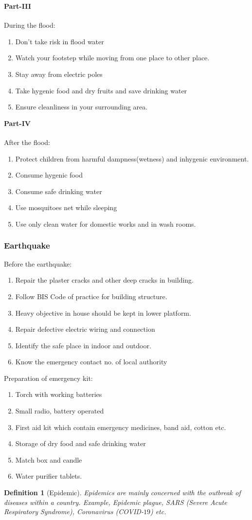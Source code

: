 \documentclass[12pt,a4paper]{article}
\newtheorem{defn}{Definition}
\begin{document}
\textbf{Part-III}\\ \\
During the flood: 
\begin{enumerate}
	\item Don't take risk in flood water
	\item Watch your footstep while moving from one place to other place.
	\item Stay away from electric poles
	\item Take hygenic food and dry fruits and save drinking water
	\item Ensure cleanliness in your surrounding area.
\end{enumerate}

\textbf{Part-IV}\\ \\
After the flood: 
\begin{enumerate}
	\item Protect children from harmful dampness(wetness) and inhygenic environment.
	\item Consume hygenic food
	\item Consume safe drinking water
	\item Use mosquitoes net while sleeping
	\item Use only clean water for domestic works and in wash rooms.
\end{enumerate}

\subsubsection*{Earthquake}
Before the earthquake:
\begin{enumerate}
	\item Repair the plaster cracks and other deep cracks in building.
	\item Follow BIS Code of practice for building structure.
	\item Heavy objective in house should be kept in lower platform.
	\item Repair defective electric wiring and connection
	\item Identify the safe place in indoor and outdoor.
	\item Know the emergency contact no. of local authority
\end{enumerate}

Preparation of emergency kit:
\begin{enumerate}
	\item Torch with working batteries
	\item Small radio, battery operated
	\item First aid kit which contain emergency medicines, band aid, cotton etc.
	\item Storage of dry food and safe drinking water
	\item Match box and candle
	\item Water purifier tablets.
\end{enumerate}
\newpage
\begin{defn}[Epidemic]\normalfont
	Epidemics are mainly concerned with the outbreak of diseases within a country. Example, Epidemic plague, SARS (Severe Acute Respiratory Syndrome), Coronavirus (COVID-$19$) etc.
\end{defn}
\end{document}
